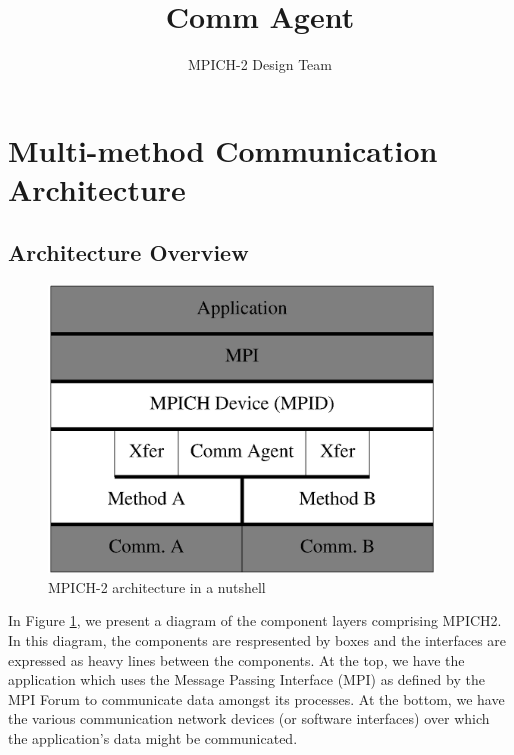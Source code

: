 \documentclass[11pt,letterpaper]{article}
\begin{document}
\date{}

\title{Comm Agent}

\author{MPICH-2 Design Team}

\maketitle

\thispagestyle{empty}

\section{Multi-method Communication Architecture}


\subsection{Architecture Overview}

\begin{figure}
\begin{center}
\includegraphics[height=3in]{mpich2-arch.eps}
\caption{\label{fig:arch} MPICH-2 architecture in a nutshell}
\end{center}
\end{figure}

In Figure \ref{fig:arch}, we present a diagram of the component layers
comprising MPICH2.  In this diagram, the components are respresented
by boxes and the interfaces are expressed as heavy lines between the
components.  At the top, we have the application which uses the
Message Passing Interface (MPI) as defined by the MPI Forum to
communicate data amongst its processes.  At the bottom, we have the
various communication network devices (or software interfaces) over
which the application's data might be communicated.
\end{document}

